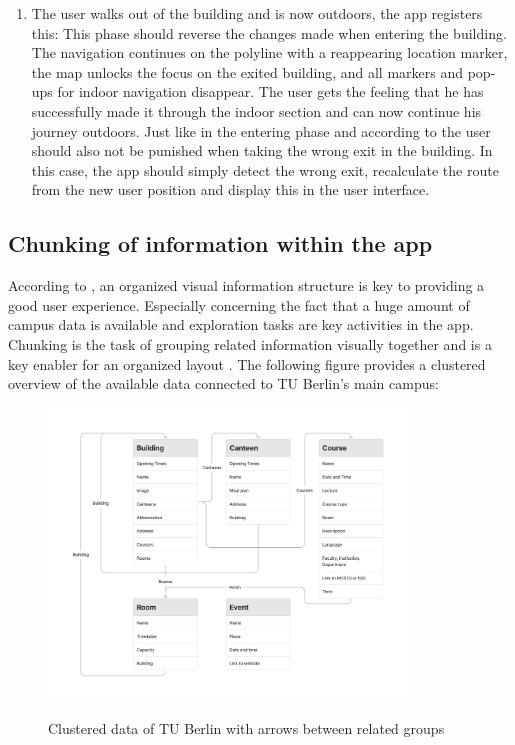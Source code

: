 \begin{enumerate}
    \item The user walks out of the building and is now outdoors, the app registers this: This phase should reverse the changes made when entering the building. The navigation continues on the polyline with a reappearing location marker, the map unlocks the focus on the exited building, and all markers and pop-ups for indoor navigation disappear. The user gets the feeling that he has successfully made it through the indoor section and can now continue his journey outdoors. Just like in the entering phase and according to \cite{postels_law} the user should also not be punished when taking the wrong exit in the building. In this case, the app should simply detect the wrong exit, recalculate the route from the new user position and display this in the user interface.
\end{enumerate}


\newpage

\subsection{Chunking of information within the app}
According to \cite{millers_law}, an organized visual information structure is key to providing a good user experience. Especially concerning the fact that a huge amount of campus data is available and exploration tasks are key activities in the app. Chunking is the task of grouping related information visually together and is a key enabler for an organized layout \cite{millers_law}. The following figure provides a clustered overview of the available data connected to TU Berlin's main campus:

\begin{figure}[H]
	\centering
	\includegraphics[width=0.85\textwidth]{images/information_cluster.png}\\
	\caption{Clustered data of TU Berlin with arrows between related groups}
\end{figure}

